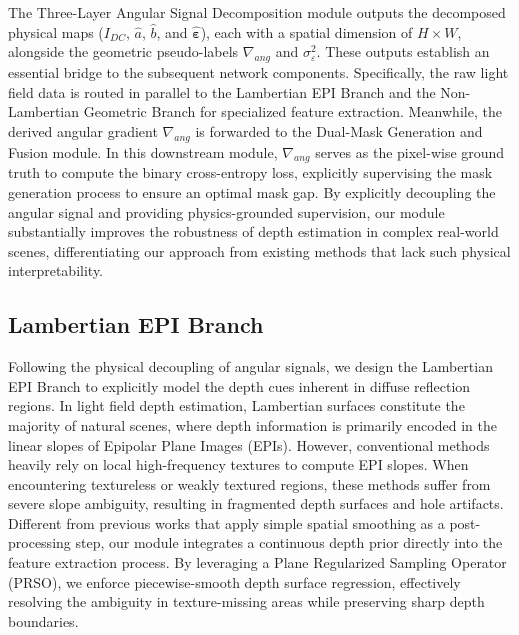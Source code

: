 \documentclass[lettersize,journal]{IEEEtran}
\begin{document}
The Three-Layer Angular Signal Decomposition module outputs the decomposed physical maps ($I_{DC}$, $\hat{a}$, $\hat{b}$, and $\hat{\boldsymbol{\varepsilon}}$), each with a spatial dimension of $H \times W$, alongside the geometric pseudo-labels $\nabla_{ang}$ and $\sigma_{\varepsilon}^2$. These outputs establish an essential bridge to the subsequent network components. Specifically, the raw light field data is routed in parallel to the Lambertian EPI Branch and the Non-Lambertian Geometric Branch for specialized feature extraction. Meanwhile, the derived angular gradient $\nabla_{ang}$ is forwarded to the Dual-Mask Generation and Fusion module. In this downstream module, $\nabla_{ang}$ serves as the pixel-wise ground truth to compute the binary cross-entropy loss, explicitly supervising the mask generation process to ensure an optimal mask gap. By explicitly decoupling the angular signal and providing physics-grounded supervision, our module substantially improves the robustness of depth estimation in complex real-world scenes, differentiating our approach from existing methods that lack such physical interpretability.

\subsection{Lambertian EPI Branch}

Following the physical decoupling of angular signals, we design the Lambertian EPI Branch to explicitly model the depth cues inherent in diffuse reflection regions. In light field depth estimation, Lambertian surfaces constitute the majority of natural scenes, where depth information is primarily encoded in the linear slopes of Epipolar Plane Images (EPIs). However, conventional methods heavily rely on local high-frequency textures to compute EPI slopes. When encountering textureless or weakly textured regions, these methods suffer from severe slope ambiguity, resulting in fragmented depth surfaces and hole artifacts. Different from previous works that apply simple spatial smoothing as a post-processing step, our module integrates a continuous depth prior directly into the feature extraction process. By leveraging a Plane Regularized Sampling Operator (PRSO), we enforce piecewise-smooth depth surface regression, effectively resolving the ambiguity in texture-missing areas while preserving sharp depth boundaries.
\end{document}
